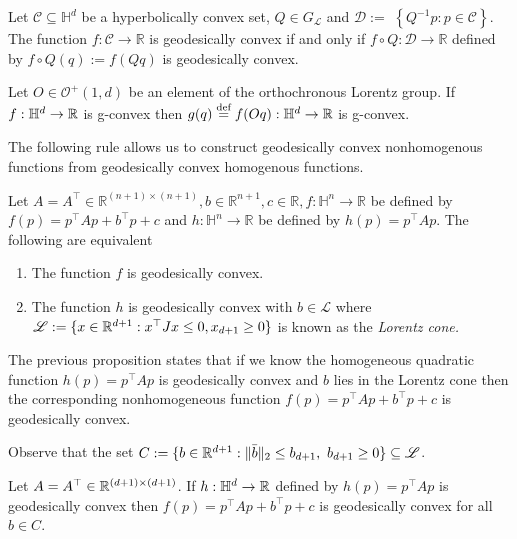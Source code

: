 \documentclass[twoside,11pt]{article}
\begin{document}
\begin{prop}\label{prop:lorentz_composition}
    Let $\mathcal{C} \subseteq \mathbb{H}^d$ be a hyperbolically convex set, $Q \in G_{\mathcal{L}}$ and $\mathcal{D}:=$ $\left\{Q^{-1} p: p \in \mathcal{C}\right\}$. The function $f: \mathcal{C} \rightarrow \mathbb{R}$ is geodesically convex if and only if $f \circ Q: \mathcal{D} \rightarrow \mathbb{R}$ defined by $f \circ Q(q):=f(Q q)$ is geodesically convex.
\end{prop}

\begin{remark}
    Let $O \in \mathcal{O}^{+}(1,d)$ be an element of the orthochronous Lorentz group. If $f:\mathbb{H}^d \to \mathbb{R}$ is g-convex then $g(q) \stackrel{\text{def}}{=} f(O q): \mathbb{H}^d \to \mathbb{R}$ is g-convex.
\end{remark}


The following rule allows us to construct geodesically convex nonhomogenous functions from geodesically convex homogenous functions.


\begin{prop}\label{prop:nonhom_hom}
    Let $A=A^{\top} \in \mathbb{R}^{(n+1) \times(n+1)}, b \in \mathbb{R}^{n+1}, c \in \mathbb{R}, f: \mathbb{H}^n \rightarrow \mathbb{R}$ be defined by $f(p)=p^{\top} A p+b^{\top} p+c$ and $h: \mathbb{H}^n \rightarrow \mathbb{R}$ be defined by $h(p)=p^{\top} A p$. The following are equivalent
    \begin{enumerate}
        \item \text The function $f$ is geodesically convex.
        \item The function $h$ is geodesically convex with $b \in \mathscr{L}$ where $\mathscr{L} := \{x \in \mathbb{R}^{d+1}: x^\top J x \leq 0, x_{d+1} \geq 0\}$ is known as the \emph{Lorentz cone.}
    \end{enumerate}
\end{prop}

The previous proposition states that if we know the homogeneous quadratic function $h(p) = p^\top A p$ is geodesically convex and $b$ lies in the Lorentz cone then the corresponding nonhomogeneous function $f(p) = p^\top A p + b^\top p + c$ is geodesically convex.

\begin{example}
    Observe that the set $C := \{b \in \mathbb{R}^{d+1} : \|\bar{b}\|_2 \leq b_{d+1}, \ b_{d+1} \geq 0\} \subseteq \mathscr{L}$. 
    
    Let $A = A^\top \in \mathbb{R}^{(d+1) \times (d+1)}$.  If $h:\mathbb{H}^d \to \mathbb{R}$ defined by $h(p) = p^\top A p$ is geodesically convex then $f(p) = p^\top A p + b^\top p + c$ is geodesically convex for all $b \in C$.
\end{example}
\end{document}
